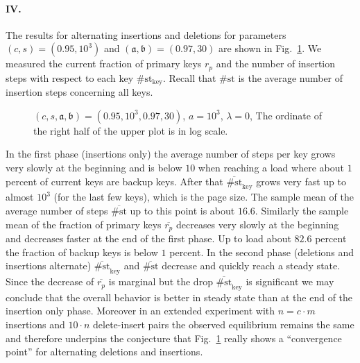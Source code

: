 \let\accentvec\vec \documentclass{llncs}
\newcommand{\fr}{\lambda}
\newcommand{\npn}{r_p}
\newcommand{\Enpn}{\overline{r_p}}
\newcommand{\st}{{\scriptstyle \#}\mathrm{st}}
\newcommand{\Est}{\overline{{\scriptstyle \#}\mathrm{st}}}
\newcommand{\palpha}{\mathfrak{a}}
\newcommand{\pbeta}{\mathfrak{b}}
\newcommand{\figPath}{.}
\begin{document}
\paragraph{IV.}
The results for alternating insertions and deletions for parameters $(c,s)=(0.95,10^3)$ and $(\palpha,\pbeta)=(0.97,30)$ are shown in Fig.~\ref{fig:number_of_steps}. We measured the current fraction of primary keys $\npn$ and the number of insertion steps with respect to each key $\st_{\mathrm{key}}$. Recall that $\st$ is the average number of insertion steps concerning all keys.
\begin{figure}[ht]
\centering
{
\scalebox{0.7}{

}
\caption{\label{fig:number_of_steps}$(c,s,\palpha,\pbeta)=(0.95,10^3,0.97,30)$, $a=10^3$, $\fr=0$, The ordinate of the right half of the upper plot is in log scale.}
}
\end{figure}
In the first phase (insertions only) the average number of steps per key grows very slowly at the beginning and is below $10$ when reaching a load where about $1$ percent of current keys are backup keys.  After that $\Est_{\mathrm{key}}$ grows very fast up to almost $10^3$ (for the last few keys), which is the page size.
The sample mean of the average number of steps $\Est$ up to this point is about $16.6$. Similarly the sample mean of the fraction of primary keys $\Enpn$ decreases very slowly at the beginning and decreases faster at the end of the first phase.
Up to load about $82.6$ percent the fraction of backup keys is below $1$ percent. 
In the second phase (deletions and insertions alternate) $\Est_{\mathrm{key}}$ and $\Est$ decrease and quickly reach a steady state. Since the decrease of $\Enpn$ is marginal but the drop $\Est_{\mathrm{key}}$ is significant we may conclude that the overall behavior is better in steady state than at the end of the insertion only phase. Moreover in an extended experiment with $n=c\cdot m$ insertions and $10\cdot n$ delete-insert pairs the observed equilibrium remains the same and therefore underpins the conjecture that Fig.~\ref{fig:number_of_steps} really shows a ``convergence point'' for alternating deletions and insertions.
\end{document}
